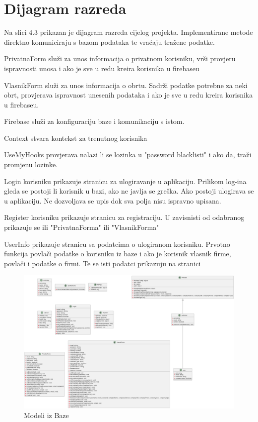 			\eject
			
		\section{Dijagram razreda}
		
			
			
			Na slici 4.3 prikazan je dijagram razreda cijelog projekta. Implementirane metode direktno komuniciraju s bazom podataka te vraćaju tražene podatke.
			
			PrivatnaForm služi za unos informacija o privatnom korisniku, vrši provjeru ispravnosti unosa i ako je sve u redu kreira korisnika u firebaseu
			
			VlasnikForm služi za unos informacija o obrtu. Sadrži podatke potrebne za neki obrt, provjerava ispravnost unesenih podataka i ako je sve u redu kreira korisnika u firebaseu.
	
	        Firebase služi za konfiguraciju baze i komunikaciju s istom. 
	        
	        Context stvara kontekst za trenutnog korisnika
	        
	        UseMyHooks provjerava nalazi li se lozinka u "password blacklisti" i ako da, traži promjenu lozinke.
	        
	        Login korisniku prikazuje stranicu za ulogiravanje u aplikaciju. Prilikom log-ina gleda se postoji li korisnik u bazi, ako ne javlja se greška. Ako postoji ulogirava se u aplikaciju. Ne dozvoljava se upis dok sva polja nisu ispravno upisana.
	        
	        Register korisniku prikazuje stranicu za registraciju. U zavisnisti od odabranog prikazuje se ili "PrivatnaForma" ili "VlasnikForma"
	        
	        UserInfo prikazuje stranicu sa podatcima o ulogiranom korisniku. Prvotno funkcija povlači podatke o korisniku iz baze i ako je korisnik vlasnik firme, povlači i podatke o firmi. Te se isti podatci prikazuju na stranici
	        
	        \begin{figure}[H]
			\includegraphics[scale=0.2]{slike/DijagramRazreda.png}
			\centering
			\caption{Modeli iz Baze}
			\label{fig:promjene}
		          \end{figure}
			

